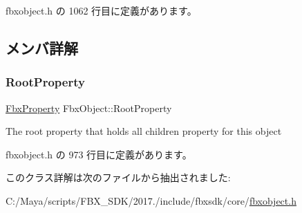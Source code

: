  fbxobject.\+h の 1062 行目に定義があります。



\subsection{メンバ詳解}
\mbox{\label{class_fbx_object_a865ee4dfaa7a8f9050105d4477288da8}} 
\subsubsection{\texorpdfstring{Root\+Property}{RootProperty}}
{\footnotesize\ttfamily \hyperlink{class_fbx_property}{Fbx\+Property} Fbx\+Object\+::\+Root\+Property}



The root property that holds all children property for this object 



 fbxobject.\+h の 973 行目に定義があります。



このクラス詳解は次のファイルから抽出されました\+:\begin{DoxyCompactItemize}
\item 
C\+:/\+Maya/scripts/\+F\+B\+X\+\_\+\+S\+D\+K/2017./include/fbxsdk/core/\hyperlink{fbxobject_8h}{fbxobject.\+h}\end{DoxyCompactItemize}
